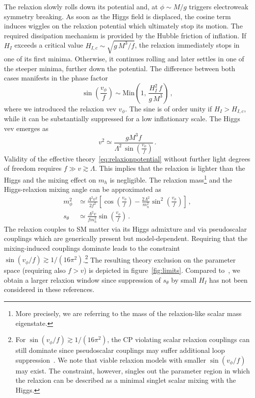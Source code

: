 \documentclass[preprintnumbers,twocolumn,aps,floats,nofootinbib]{revtex4-1}
\begin{document}
The relaxion slowly rolls down its potential and, at $\phi \sim M/g$ triggers electroweak symmetry breaking. As soon as the Higgs field is displaced, the cosine term induces wiggles on the relaxion potential which ultimately stop its motion. The required dissipation mechanism is provided by the Hubble friction of inflation. If $H_I$ exceeds a critical value $H_{I,c}\sim\sqrt{g\,M^3/f}$, the relaxion immediately stops in one of its first minima. Otherwise, it continues rolling and later settles in one of the steeper minima, further down the potential. The difference between both cases manifests in the phase factor 
\begin{equation}
 \sin\left(\frac{v_\phi}{f}\right)\sim \text{Min}\left(1,\,\frac{H_I^2\,f}{g\,M^3}\right)\,,
\end{equation}
where we introduced the relaxion vev $v_\phi$. The sine is of order unity if $H_I>H_{I,c}$, while it can be substantially suppressed for a low inflationary scale. The Higgs vev emerges as
\begin{equation}
 v^2  \simeq \frac{g M^3 f}{\Lambda^2\,\sin\left(\frac{v_\phi}{f}\right)}\,.
\end{equation}
Validity of the effective theory~\eqref{eq:relaxionpotential} without further light degrees of freedom requires $f \gg v \gtrsim \Lambda$. This implies that the relaxion is lighter than the Higgs and the mixing effect on $m_h$ is negligible. The relaxion mass\footnote{More precisely, we are referring to the mass of the relaxion-like scalar mass eigenstate.} and the Higgs-relaxion mixing angle can be approximated as~\cite{Flacke:2016szy}
\begin{align}
 m_\phi^2 &\simeq \frac{\Lambda^2 v^2}{2 f^2} \left[\cos\left(\frac{v_\phi}{f}\right)-\frac{2\Lambda^2}{m_h^2}\sin^2\left({\frac{v_\phi}{f}}\right)\right]\,,\nonumber\\
 s_\theta& \simeq \frac{\Lambda^2 v}{f m_h^2}\sin\left(\frac{v_\phi}{f}\right)\,.
\end{align}
The relaxion couples to SM matter via its Higgs admixture and via pseudoscalar couplings which are generically present but model-dependent. Requiring that the mixing-induced couplings dominate leads to the constraint $\sin(v_\phi/f)\gtrsim 1/(16\pi^2)$.\footnote{For $\sin(v_\phi/f)\gtrsim 1/(16\pi^2)$, the CP violating scalar relaxion couplings can still dominate since pseudoscalar couplings may suffer additional loop suppression~\cite{Flacke:2016szy}. We note that viable relaxion models with smaller $\sin(v_\phi/f)$ may exist. The constraint, however, singles out the parameter region in which the relaxion can be described as a minimal singlet scalar mixing with the Higgs.} The resulting theory exclusion on the parameter space (requiring also $f>v$) is depicted in figure~\ref{fig:limits}. Compared to~\cite{Choi:2016luu,Flacke:2016szy}, we obtain a larger relaxion window since suppression of $s_\theta$ by small $H_I$ has not been considered in these references.
\end{document}
